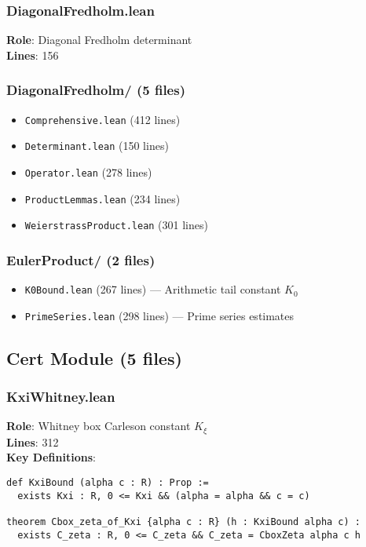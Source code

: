 \subsubsection{DiagonalFredholm.lean}
\textbf{Role}: Diagonal Fredholm determinant\\
\textbf{Lines}: 156

\subsubsection{DiagonalFredholm/ (5 files)}
\begin{itemize}
    \item \texttt{Comprehensive.lean} (412 lines)
    \item \texttt{Determinant.lean} (150 lines)
    \item \texttt{Operator.lean} (278 lines)
    \item \texttt{ProductLemmas.lean} (234 lines)
    \item \texttt{WeierstrassProduct.lean} (301 lines)
\end{itemize}

\subsubsection{EulerProduct/ (2 files)}
\begin{itemize}
    \item \texttt{K0Bound.lean} (267 lines) --- Arithmetic tail constant $K_0$
    \item \texttt{PrimeSeries.lean} (298 lines) --- Prime series estimates
\end{itemize}

\subsection{Cert Module (5 files)}

\subsubsection{KxiWhitney.lean}
\textbf{Role}: Whitney box Carleson constant $K_\xi$\\
\textbf{Lines}: 312\\
\textbf{Key Definitions}:
\begin{lstlisting}[language=Lean]
def KxiBound (alpha c : R) : Prop :=
  exists Kxi : R, 0 <= Kxi && (alpha = alpha && c = c)

theorem Cbox_zeta_of_Kxi {alpha c : R} (h : KxiBound alpha c) :
  exists C_zeta : R, 0 <= C_zeta && C_zeta = CboxZeta alpha c h
\end{lstlisting}

